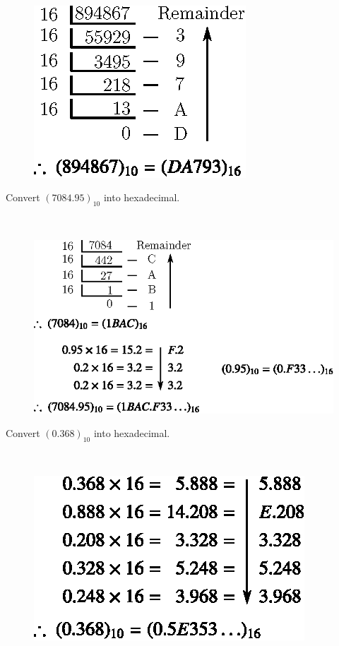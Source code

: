 \begin{solution}
~
\begin{figure}[H]
\centering
\includegraphics[scale=1.07]{chap5/div15.eps}
\end{figure}
\end{solution}

\eject

\begin{problem}\label{prob5.15}
Convert $(7084.95)_{10}$ into hexadecimal.
\end{problem}

\begin{solution}
~
\begin{figure}[H]
\centering
\includegraphics{chap5/div16.eps}
\end{figure}
\end{solution}

\begin{problem}\label{prob5.16}
Convert $(0.368)_{10}$ into hexadecimal.
\end{problem}

\begin{solution}
~
\begin{figure}[H]
\centering
\includegraphics{chap5/div17.eps}
\end{figure}
\end{solution}

